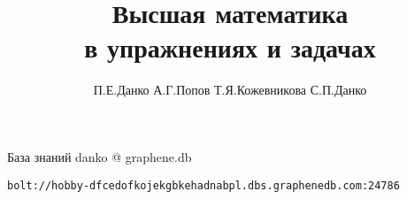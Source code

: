 
\title{Высшая математика\\в упражнениях и задачах}
\author{П.Е.Данко А.Г.Попов Т.Я.Кожевникова С.П.Данко}

\maketitle

\tableofcontents
\vspace{2cm}
База знаний danko @ graphene.db
\begin{verbatim}
bolt://hobby-dfcedofkojekgbkehadnabpl.dbs.graphenedb.com:24786
\end{verbatim}
\clearpage





